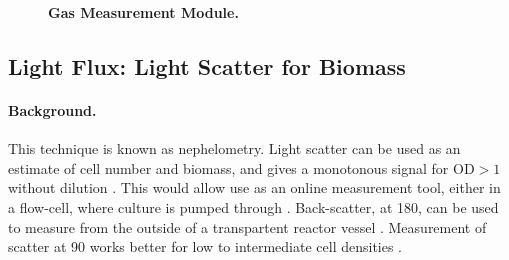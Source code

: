 \documentclass[12pt,a4paper]{scrartcl}
\begin{document}
\begin{figure}[ht]
  \begin{minipage}{.49\textwidth}
  \end{minipage}
  \begin{minipage}{.49\textwidth}
  \end{minipage}
\caption[]{\textbf{Gas Measurement Module.}}
\end{figure}

\clearpage
\subsection{Light Flux: Light Scatter for Biomass} 
\label{scatter}

\paragraph{Background.}
This technique is known as nephelometry.  Light scatter can be used as
an estimate of cell number and biomass, and gives a monotonous signal
for OD$>1$ without dilution \citep{Hancher1974}. This would allow use
as an online measurement tool, either in a flow-cell, where culture is
pumped through \citep{Hancher1974}. Back-scatter, at 180\textdegree{},
can be used to measure from the outside of a transpartent reactor
vessel \citep{Ude2014, Bruder2016}. Measurement of scatter at
90\textdegree{} works better for low to intermediate cell densities
\citep{Ude2014}.
\end{document}

